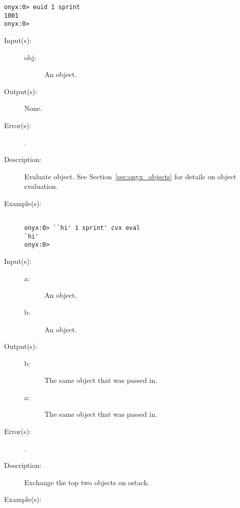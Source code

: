 \begin{description}
\begin{description}
\begin{verbatim}
onyx:0> euid 1 sprint
1001
onyx:0>
		\end{verbatim}
	\end{description}
\label{systemdict:eval}
\item[{\onyxop{obj}{eval}{--}}: ]
	\begin{description}\item[]
	\item[Input(s): ]
		\begin{description}\item[]
		\item[obj: ]
			An object.
		\end{description}
	\item[Output(s): ] None.
	\item[Error(s): ]
		\begin{description}\item[]
		\item[.]
		\end{description}
	\item[Description: ]
		Evaluate object.  See Section~\ref{sec:onyx_objects} for
		details on object evaluation.
	\item[Example(s): ]\begin{verbatim}

onyx:0> ``hi' 1 sprint' cvx eval
`hi'
onyx:0>
		\end{verbatim}
	\end{description}
\label{systemdict:exch}
\item[{\onyxop{a b}{exch}{b a}}: ]
	\begin{description}\item[]
	\item[Input(s): ]
		\begin{description}\item[]
		\item[a: ]
			An object.
		\item[b: ]
			An object.
		\end{description}
	\item[Output(s): ]
		\begin{description}\item[]
		\item[b: ]
			The same object that was passed in.
		\item[a: ]
			The same object that was passed in.
		\end{description}
	\item[Error(s): ]
		\begin{description}\item[]
		\item[.]
		\end{description}
	\item[Description: ]
		Exchange the top two objects on ostack.
	\item[Example(s): ]\begin{verbatim}


\end{verbatim}
\end{description}
\end{description}
